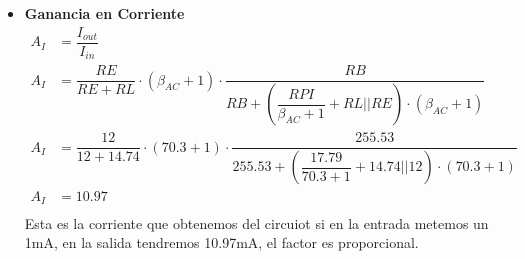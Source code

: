 \begin{itemize}
\item \textbf{Ganancia en Corriente}
    \begin{equation}
  \begin{split}
    A_I & = \dfrac{I_{out}}{I_{in}} \\
    A_I & = \dfrac{RE}{RE+RL} \cdot (\beta_{AC}+1) \cdot
    \dfrac{RB}{RB+(\dfrac{RPI}{\beta_{AC}+1}+RL||RE)\cdot
      (\beta_{AC}+1)}\\
    A_I & = \dfrac{12}{12+14.74} \cdot (70.3+1) \cdot
    \dfrac{255.53}{255.53+(\dfrac{17.79}{70.3+1}+14.74||12)\cdot (70.3+1)}\\
    A_I & = 10.97\\
  \end{split}
\end{equation}
Esta es la corriente que obtenemos del circuiot si en la entrada
metemos un 1mA, en la salida tendremos 10.97mA, el factor es proporcional.
\end{itemize}

